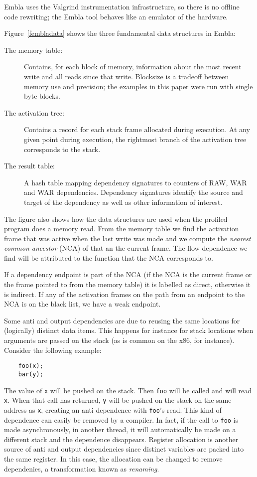 Embla uses the Valgrind instrumentation infrastructure, so there
is no offline code rewriting; the Embla tool behaves like an emulator
of the hardware.

Figure~\ref{fembladata} shows the three fundamental data structures 
in Embla:
\begin{description}
\item[The memory table:]
Contains, for each block of memory, information about the most 
recent write and all reads since that write. 
Blocksize is a tradeoff between memory use and precision; the examples in 
this paper were run with single byte blocks. 
\item[The activation tree:]
Contains a record for each stack frame allocated during execution. 
At any given point during execution, 
the rightmost branch of the activation tree corresponds to the stack.
\item[The result table:]
A hash table mapping dependency signatures to counters of RAW, WAR 
and WAR dependencies. Dependency signatures identify the source and
target of the dependency as well as other information of interest.
\end{description}
The figure also shows how the data structures are used when the
profiled program does a memory read. From the memory table we find the
activation frame that was active when the last write was made and we
compute the {\em nearest common ancestor} (NCA) of that an the
current frame. The flow dependence we find will be attributed to the
function that the NCA corresponds to. 

If a dependency endpoint is part of the NCA (if the NCA is the current
frame or the frame pointed to from the memory table) it is labelled as
direct, otherwise it is indirect. If any of the activation frames on
the path from an endpoint to the NCA is on the black list, we have a
weak endpoint.


Some anti and output dependencies are due to reusing the same
locations for (logically) distinct data items. This happens for
instance for stack locations when arguments are passed on the stack
(as is common on the x86, for instance). Consider the following
example:
\begin{verbatim}
    foo(x);
    bar(y);
\end{verbatim}
The value of {\tt x} will be pushed on the stack. Then {\tt foo} will
be called and will read {\tt x}. When that call has returned, {\tt y}
will be pushed on the stack on the same address as {\tt x}, creating
an anti dependence with {\tt foo}'s read. This kind of dependence can 
easily be removed by a
compiler. In fact, if the call to {\tt foo} is made asynchronously, in
another thread, it will automatically be made on a different stack and
the dependence disappears. Register allocation is another source of
anti and output dependencies since distinct variables are packed into
the same register. In this case, the allocation can be changed to
remove dependenies, a transformation known as {\em renaming}.

